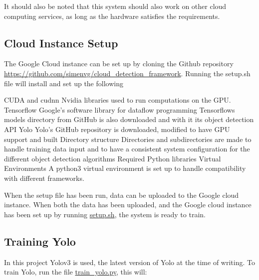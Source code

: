 \vspace{3mm}

It should also be noted that this system should also work on other cloud computing services, as long as the hardware satisfies the requirements. 

\subsection{Cloud Instance Setup}
The Google Cloud instance can be set up by cloning the Github repository \url{https://github.com/simenvg/cloud_detection_framework}. Running the setup.sh file will install and set up the following 

\begin{outline}
    \1 CUDA and cudnn
       \2 Nvidia libraries used to run computations on the GPU. 
    \1 Tensorflow
       \2 Google's software library for dataflow programming
       \2 Tensorflows models directory from GitHub is also downloaded and with it its object detection API
    \1 Yolo
       \2 Yolo's GitHub repository is downloaded, modified to have GPU support and built
    \1 Directory structure
       \2 Directories and subdirectories are made to handle training data input and to have a consistent system configuration for the different object detection algorithms
    \1 Required Python libraries
    \1 Virtual Environments
       \2 A python3 virtual environment is set up to handle compatibility with different frameworks.
\end{outline}



When the setup file has been run, data can be uploaded to the Google cloud instance. When both the data has been uploaded, and the Google cloud instance has been set up by running \url{setup.sh}, the system is ready to train.

\subsection{Training Yolo}
In this project Yolov3 is used, the latest version of Yolo at the time of writing. To train Yolo, run the file \url{train_yolo.py}, this will:

